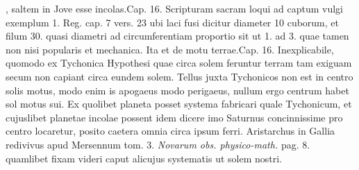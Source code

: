 , saltem  in Jove\protect{} esse incolas.\pend \pstart  Cap. 16. Scripturam sacram  loqui ad captum vulgi exemplum 1. Reg. cap. 7  vers. 23 ubi laci fusi dicitur diameter 10  cuborum, et filum 30. quasi diametri  ad circumferentiam proportio sit ut 1. ad  3. quae tamen non nisi popularis et  mechanica. Ita et de motu terrae\protect{}.\pend \pstart  Cap. 16. Inexplicabile, quomodo ex Tychonica Hypothesi  quae circa solem feruntur terram\protect{} tam  exiguam secum non capiant circa eundem solem\protect{}. Tellus juxta Tychonicos non est  in centro solis motus\protect{}, modo enim is apogaeus modo perigaeus, nullum ergo centrum  habet sol motus\protect{} sui. Ex quolibet planeta\protect{} posset systema fabricari quale Tychonicum,  et cujuslibet planetae\protect{} incolae possent  idem dicere imo Saturnus\protect{} concinnissime pro centro locaretur, posito caetera  omnia circa ipsum ferri.\pend \pstart {} Aristarchus\protect{} in Gallia\protect{} redivivus apud Mersennum\protect{} tom. 3. \textit{Novarum obs. physico-math.} pag. 8. quamlibet  fixam videri caput alicujus systematis ut solem\protect{}  nostri.\pend 